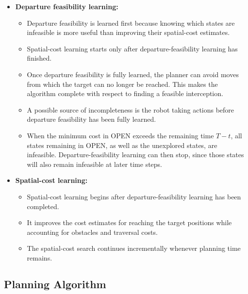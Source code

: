 \documentclass[11pt]{article}
\begin{document}
\begin{itemize}
  \item \textbf{Departure feasibility learning:}
        \begin{itemize}
          \item Departure feasibility is learned first because knowing which
                states are infeasible is more useful than improving their spatial-cost
                estimates.

          \item Spatial-cost learning starts only after departure-feasibility
                learning has finished.

          \item Once departure feasibility is fully learned, the planner can
                avoid moves from which the target can no longer be reached. This makes
                the algorithm complete with respect to finding a feasible interception.

          \item A possible source of incompleteness is the robot taking actions
                before departure feasibility has been fully learned.

          \item When the minimum cost in OPEN exceeds the remaining time
                \(T-t\), all states remaining in OPEN, as well as the unexplored
                states, are infeasible. Departure-feasibility learning can then stop,
                since those states will also remain infeasible at later time steps.
        \end{itemize}

  \item \textbf{Spatial-cost learning:}
        \begin{itemize}
          \item Spatial-cost learning begins after departure-feasibility learning
                has been completed.

          \item It improves the cost estimates for reaching the target positions
                while accounting for obstacles and traversal costs.

          \item The spatial-cost search continues incrementally whenever
                planning time remains.
        \end{itemize}
\end{itemize}

\subsection{Planning Algorithm}
\label{sec:real-time-search-framework}
\end{document}
